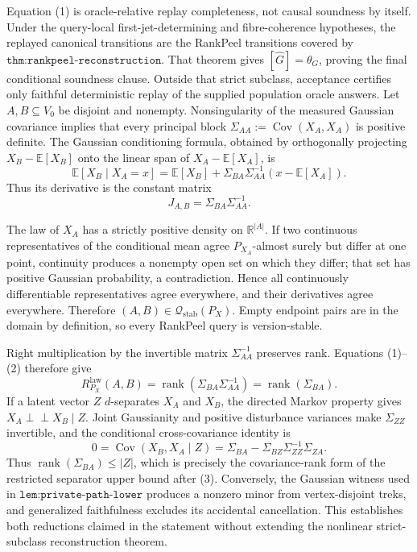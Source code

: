 Equation (1) is oracle-relative replay completeness, not causal soundness by itself.  Under the query-local first-jet-determining and fibre-coherence hypotheses, the replayed canonical transitions are the RankPeel transitions covered by \(\texttt{thm:rankpeel-reconstruction}\).  That theorem gives \([\widehat G]=\theta_G\), proving the final conditional soundness clause.  Outside that strict subclass, acceptance certifies only faithful deterministic replay of the supplied population oracle answers.
Let \(A,B\subseteq V_0\) be disjoint and nonempty.  Nonsingularity of the measured Gaussian covariance implies that every principal block \(\Sigma_{AA}:=\operatorname{Cov}(X_A,X_A)\) is positive definite.  The Gaussian conditioning formula, obtained by orthogonally projecting \(X_B-\mathbb E[X_B]\) onto the linear span of \(X_A-\mathbb E[X_A]\), is
\[
 \mathbb E[X_B\mid X_A=x]
 =\mathbb E[X_B]+\Sigma_{BA}\Sigma_{AA}^{-1}(x-\mathbb E[X_A]). \tag{1}
\]
Thus its derivative is the constant matrix
\[
 J_{A,B}=\Sigma_{BA}\Sigma_{AA}^{-1}. \tag{2}
\]

The law of \(X_A\) has a strictly positive density on \(\mathbb R^{|A|}\).  If two continuous representatives of the conditional mean agree \(P_{X_A}\)-almost surely but differ at one point, continuity produces a nonempty open set on which they differ; that set has positive Gaussian probability, a contradiction.  Hence all continuously differentiable representatives agree everywhere, and their derivatives agree everywhere.  Therefore \((A,B)\in\mathcal Q_{\mathrm{stab}}(P_X)\).  Empty endpoint pairs are in the domain by definition, so every RankPeel query is version-stable.

Right multiplication by the invertible matrix \(\Sigma_{AA}^{-1}\) preserves rank.  Equations (1)--(2) therefore give
\[
 R^{\mathrm{law}}_{P_X}(A,B)
 =\operatorname{rank}(\Sigma_{BA}\Sigma_{AA}^{-1})
 =\operatorname{rank}(\Sigma_{BA}). \tag{3}
\]
If a latent vector \(Z\) \(d\)-separates \(X_A\) and \(X_B\), the directed Markov property gives \(X_A\mathbin{\perp\!\!\!\perp}X_B\mid Z\).  Joint Gaussianity and positive disturbance variances make \(\Sigma_{ZZ}\) invertible, and the conditional cross-covariance identity is
\[
 0=\operatorname{Cov}(X_B,X_A\mid Z)
   =\Sigma_{BA}-\Sigma_{BZ}\Sigma_{ZZ}^{-1}\Sigma_{ZA}. \tag{4}
\]
Thus \(\operatorname{rank}(\Sigma_{BA})\leq |Z|\), which is precisely the covariance-rank form of the restricted separator upper bound after (3).  Conversely, the Gaussian witness used in \(\texttt{lem:private-path-lower}\) produces a nonzero minor from vertex-disjoint treks, and generalized faithfulness excludes its accidental cancellation.  This establishes both reductions claimed in the statement without extending the nonlinear strict-subclass reconstruction theorem.
